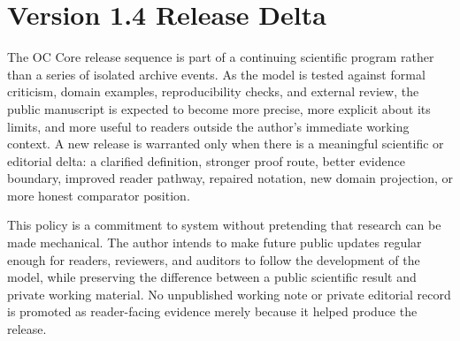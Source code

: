 \begin{abstract}
The manuscript contains the full monograph body, a compact article route, a
methods and reproducibility route, reviewer-response material, proof and
formalization sections, finite-model and numerical evidence anchors, figure and
table material, source-trace appendices, and practical-use boundaries. Figures
and tables are retained as scientific material; formulas and theorem statements
are retained in the mathematical spine; machine-readable registers remain in
the evidence package where they can be audited without becoming the narrative
structure of the manuscript.

The practical value of the release is a disciplined compression without loss of
meaning. If OC is useful, it should help a scientific reviewer, a systems
theorist, an AI builder, an enterprise architect, or an evidence auditor
translate a complex system into a common ontology while preserving the
differences that matter. The principal limitation is part of the method:
future releases must add evidence, mechanization, comparator work, or domain
validation before they widen the public claim surface. Version~1.4 therefore
offers a publication-grade basis for external review, not a claim that every
future scientific obligation has already been discharged.
\end{abstract}

\clearpage
\section*{Version 1.4 Release Delta}
{}
The OC Core release sequence is part of a continuing scientific program rather
than a series of isolated archive events. As the model is tested against formal
criticism, domain examples, reproducibility checks, and external review, the
public manuscript is expected to become more precise, more explicit about its
limits, and more useful to readers outside the author's immediate working
context. A new release is warranted only when there is a meaningful scientific
or editorial delta: a clarified definition, stronger proof route, better
evidence boundary, improved reader pathway, repaired notation, new domain
projection, or more honest comparator position.

This policy is a commitment to system without pretending that research can be
made mechanical. The author intends to make future public updates regular
enough for readers, reviewers, and auditors to follow the development of the
model, while preserving the difference between a public scientific result and
private working material. No unpublished working note or private editorial
record is promoted as reader-facing evidence merely because it
helped produce the release.

